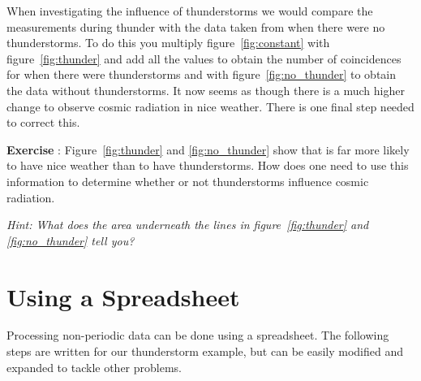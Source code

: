 When investigating the influence of thunderstorms we would compare the measurements during thunder with the data taken from when there were no thunderstorms. To do this you multiply figure~\ref{fig:constant} with figure~\ref{fig:thunder} and add all the values to obtain the number of coincidences for when there were thunderstorms and with figure~\ref{fig:no_thunder} to obtain the data without thunderstorms. It now seems as though there is a much higher change to observe cosmic radiation in nice weather. There is one final step needed to correct this.

\begin{shaded}
\textbf{Exercise \theExercise {}} : Figure~\ref{fig:thunder} and \ref{fig:no_thunder} show that is far more likely to have nice weather than to have thunderstorms. How does one need to use this information to determine whether or not thunderstorms influence cosmic radiation.

\emph{Hint: What does the area underneath the lines in figure~\ref{fig:thunder} and \ref{fig:no_thunder} tell you?}
\end{shaded}

\section{Using a Spreadsheet}
Processing non-periodic data can be done using a spreadsheet. The following steps are written for our thunderstorm example, but can be easily modified and expanded to tackle other problems.

